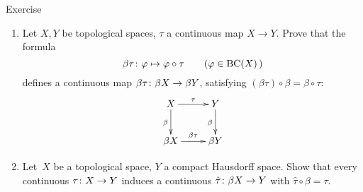 \documentclass[main.tex]{subfiles}
\begin{document}
%
%
\begin{psec}{4.14}{Exercise}
\begin{enumerate}
\item \label{4.14-1}
Let $X,Y$ be topological spaces,
$\tau$ a continuous map $X\rightarrow Y$.
Prove that the formula
\begin{equation*}
\beta\tau\colon\varphi\mapsto\varphi\circ\tau\qquad(\varphi\in\mathrm{BC}(X)\,)
\end{equation*}
defines a continuous map $\beta\tau\colon\beta X\rightarrow\beta Y$,
satisfying $(\beta\tau)\circ\beta=\beta\circ\tau$:
\begin{equation*}
\xymatrix{
X\ar[r]^\tau \ar[d]_\beta& Y\ar[d]_\beta \\
\beta X\ar[r]^{\beta\tau} & \beta Y
}
\end{equation*}
%
\item \label{4.14-2}
Let~$X$ be a topological space, 
$Y$ a compact Hausdorff space.
Show that every continuous $\tau\colon X\rightarrow Y$
induces a continuous $\hat\tau\colon\beta X\rightarrow Y$
with $\hat\tau\circ\beta=\tau$.
\end{enumerate}
\end{psec}
\clearpage
\end{document}
